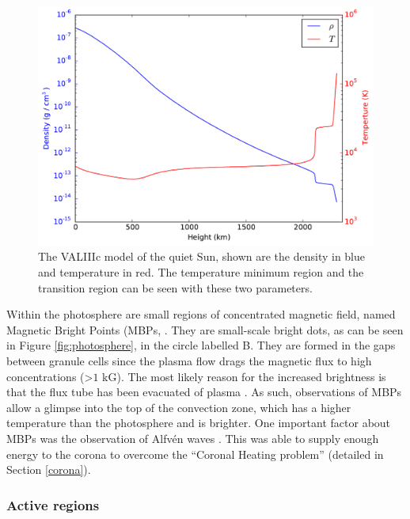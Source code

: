     \begin{figure}    
       	\centering
       	\includegraphics[width=\textwidth]{val3.pdf}
       	\caption{
       		     The VALIIIc \citep{1981ApJS...45..635V} model of the quiet Sun, shown are the density in blue and temperature in red.
       		     The temperature minimum region and the transition region can be seen with these two parameters.
                 }
       	\label{fig:valc}        
    \end{figure} 
    
    Within the photosphere are small regions of concentrated magnetic field, named Magnetic Bright Points (MBPs, \citealt{2013Ap&SS.348...17F}.
    They are small-scale bright dots, as can be seen in Figure \ref{fig:photosphere}, in the circle labelled B.
    They are formed in the gaps between granule cells since the plasma flow drags the magnetic flux to high concentrations (>$1$ kG).
    The most likely reason for the increased brightness is that the flux tube has been evacuated of plasma \citep{2004ApJ...609L..91S}.
    As such, observations of MBPs allow a glimpse into the top of the convection zone, which has a higher temperature than the photosphere and is brighter.
    One important factor about MBPs was the observation of Alfv\'en waves \citep{Jess2009,Taroyan2009}.
    This was able to supply enough energy to the corona to overcome the ``Coronal Heating problem'' (detailed in Section \ref{corona}).
    
\subsubsection{Active regions}
    
